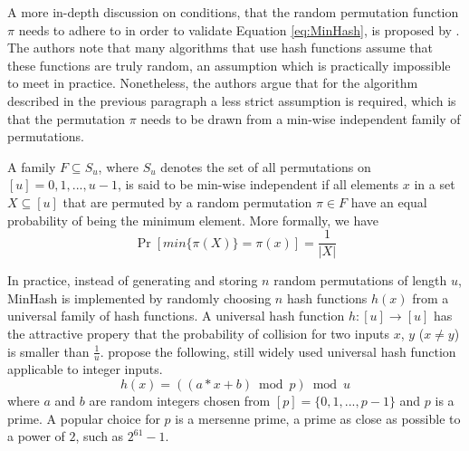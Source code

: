 A more in-depth discussion on conditions, that the random permutation function $\pi$ needs to adhere to in order to validate Equation \ref{eq:MinHash}, is proposed by \cite{DBLP:journals/jcss/BroderCFM00}. The authors note that many algorithms that use hash functions assume that these functions are truly random, an assumption which is practically impossible to meet in practice. Nonetheless, the authors argue that for the algorithm described in the previous paragraph a less strict assumption is required, which is that the permutation $\pi$ needs to be drawn from a min-wise independent family of permutations.

A family $F\subseteq S_u$, where $S_u$ denotes the set of all permutations on $[u] = {0,1,...,u-1}$, is said to be min-wise independent if all elements $x$ in a set $X \subseteq [u]$ that are permuted by a random permutation $\pi \in F$ have an equal probability of being the minimum element. More formally, we have 
\begin{equation}
    \operatorname{Pr}[min\{\pi(X)\}=\pi(x)] = \frac{1}{|X|}
\end{equation}

In practice, instead of generating and storing $n$ random permutations of length $u$, MinHash is implemented by randomly choosing $n$ hash functions $h(x)$ from a universal family of hash functions. A universal hash function $h:[u]\rightarrow[u]$ has the attractive propery that the probability of collision for two inputs $x$, $y$ ($x\neq y$) is smaller than $\frac{1}{u}$. \cite{CarterW79} propose the following, still widely used universal hash function applicable to integer inputs.
\begin{equation}
    h(x) = ((a * x + b) \bmod p) \bmod u
    \label{eq:universal_hashing}
\end{equation}
where $a$ and $b$ are random integers chosen from $[p] = \{0,1,...,p-1\}$ and $p$ is a prime. A  popular choice for $p$ is a mersenne prime, a prime as close as possible to a power of $2$, such as $2^{61} - 1$. 


